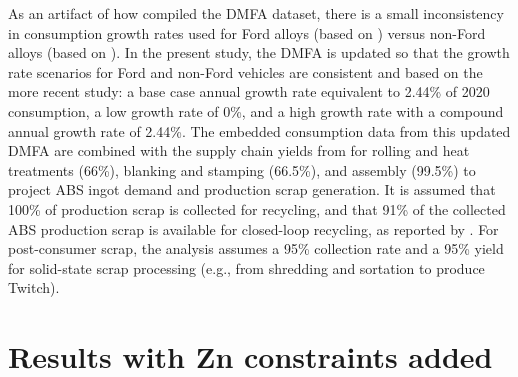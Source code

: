 As an artifact of how \cite{zhuDynamicMaterialFlow2025} compiled the DMFA dataset, there is a small inconsistency in consumption growth rates used for Ford alloys (based on \cite{zhu_coming_2021}) versus non-Ford alloys (based on \cite{ducker_2023}). In the present study, the DMFA is updated so that the growth rate scenarios for Ford and non-Ford vehicles are consistent and based on the more recent \cite{ducker_2023} study: a base case annual growth rate equivalent to 2.44\% of 2020 consumption, a low growth rate of 0\%, and a high growth rate with a compound annual growth rate of 2.44\%. The embedded consumption data from this updated DMFA are combined with the supply chain yields from \cite{heidari_circular_2026} for rolling and heat treatments (66\%), blanking and stamping (66.5\%), and assembly (99.5\%) to project ABS ingot demand and production scrap generation. It is assumed that 100\% of production scrap is collected for recycling, and that 91\% of the collected ABS production scrap is available for closed-loop recycling, as reported by \cite{heidari_circular_2026}. For post-consumer scrap, the analysis assumes a 95\% collection rate \citep{wang_environmental_2022} and a 95\% yield \citep{kelly_recycling_2018} for solid-state scrap processing (e.g., from shredding and sortation to produce Twitch).


\section{Results with Zn constraints added} \label{SI: Results w/ Zn}

